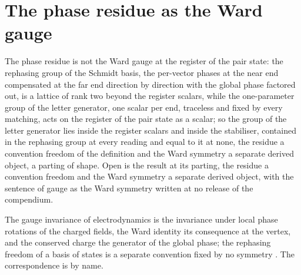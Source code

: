 \section{The phase residue as the Ward gauge}\label{mod:V-1-D536052-w-prwg}
\begin{chwall}\label{box:V-1-D536052-w-prwg:1}
The phase residue is not the Ward gauge at the register of the pair state: the rephasing group of the Schmidt basis, the per-vector phases at the near end compensated at the far end direction by direction with the global phase factored out, is a lattice of rank two beyond the register scalars, while the one-parameter group of the letter generator, one scalar per end, traceless and fixed by every matching, acts on the register of the pair state as a scalar; so the group of the letter generator lies inside the register scalars and inside the stabiliser, contained in the rephasing group at every reading and equal to it at none, the residue a convention freedom of the definition and the Ward symmetry a separate derived object, a parting of shape.
Open is the result at its parting, the residue a convention freedom and the Ward symmetry a separate derived object, with the sentence of gauge as the Ward symmetry written at no release of the compendium.
\end{chwall}
\begin{chbridge}
The gauge invariance of electrodynamics is the invariance under local phase rotations of the charged fields, the Ward identity its consequence at the vertex, and the conserved charge the generator of the global phase; the rephasing freedom of a basis of states is a separate convention fixed by no symmetry \cite{Weyl1929,Ward1950}. The correspondence is by name.
\end{chbridge}
